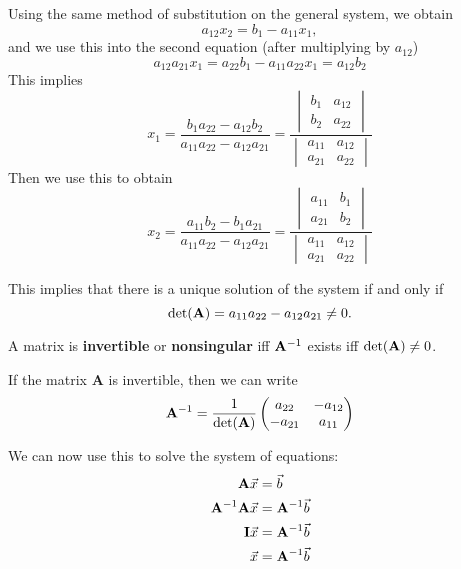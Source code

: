 \begin{definition}
	
Using the same method of substitution on the general system, we obtain
$$
a_{12} x_2 = b_1 - a_{11} x_1,
$$
and we use this into the second equation (after multiplying by $a_{12}$)
$$
a_{12} a_{21} x_1 = a_{22} b_1 - a_{11}a_{22} x_1 = a_{12} b_2
$$
This implies 
$$
x_1 
	= \frac{b_1 a_{22} - a_{12} b_2}{a_{11}a_{22} - a_{12}a_{21}}
	= \frac{
		\begin{vmatrix} 
			b_1 & a_{12} \\
			b_2 & a_{22}
		\end{vmatrix}
		}{
		\begin{vmatrix} 
			a_{11} & a_{12} \\
			a_{21} & a_{22}
		\end{vmatrix}
		}
$$
Then we use this to obtain
$$
x_2
	= \frac{a_{11} b_2  - b_1 a_{21} }{a_{11}a_{22} - a_{12}a_{21}}
	= \frac{
		\begin{vmatrix} 
			a_{11} & b_1 \\
			a_{21} & b_2
		\end{vmatrix}
		}{
		\begin{vmatrix} 
			a_{11} & a_{12} \\
			a_{21} & a_{22}
		\end{vmatrix}
		}
$$

\end{definition}

\begin{important}
This implies that there is a unique solution of the system if and only if
$$
\det ({\bf A}) = a_{11}a_{22} - a_{12}a_{21} \neq 0.
$$
\end{important}



\begin{definition}
 A matrix is {\bf invertible} or {\bf nonsingular} \quad iff \quad ${\bf A}^{-1}$ exists \quad iff \quad $\det({\bf A}) \neq 0$.

If the matrix {\bf A} is invertible, then we can write
$$
{\bf A}^{-1} 
	= \frac{1}{\det({\bf A})} \begin{pmatrix}
						a_{22} & -a_{12} \\
						-a_{21} & a_{11}
						\end{pmatrix}
$$

We can now use this to solve the system of equations:
\begin{align*}
{\bf A} \vec{x}	& = \vec{b}  \\
{\bf A}^{-1} {\bf A} \vec{x}	& = {\bf A}^{-1} \vec{b}  \\
{\bf I} \vec{x}	& = {\bf A}^{-1} \vec{b}  \\
\vec{x}	& = {\bf A}^{-1} \vec{b}
\end{align*}

\end{definition}





